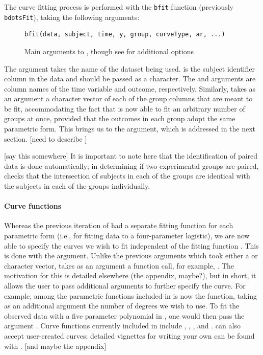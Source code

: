 The curve fitting process is performed with the \texttt{bfit} function (previously \texttt{bdotsFit}), taking the following arguments:


\begin{figure}[h!]
\centering
\begin{BVerbatim}
bfit(data, subject, time, y, group, curveType, ar, ...)
\end{BVerbatim}
\caption{Main arguments to , though see  for additional options}
\end{figure}



The  argument takes the name of the dataset being used.  is the subject identifier column in the data and should be passed as a character.  The  and  arguments are column names of the time variable and outcome, respectively. Similarly,  takes as an argument a character vector of each of the group columns that are meant to be fit, accommodating the fact that  is now able to fit an arbitrary number of groups at once, provided that the outcomes in each group adopt the same parametric form. This brings us to the  argument, which is addressed in the next section. [need to describe ]

[say this somewhere] It is important to note here that the identification of paired data is done automatically; in determining if two experimental groups are paired,  checks that the intersection of subjects in each of the groups are identical with the subjects in each of the groups individually.


\paragraph{Curve functions} Whereas the previous iteration of  had a separate fitting function for each parametric form (i.e.,  for fitting data to a four-parameter logistic), we are now able to specify the curves we wish to fit independent of the fitting function . This is done with the  argument. Unlike the previous arguments which took either a  or character  vector,  takes as an argument a function call, for example, . The motivation for this is detailed elsewhere (the appendix, maybe?), but in short, it allows the user to pass additional arguments to further specify the curve. For example, among the parametric functions included in  is now the  function, taking as an additional argument the number of degrees we wish to use. To fit the observed data with a five parameter polynomial in , one would then pass the argument . Curve functions currently included in  include , , , and .  can also accept user-created curves; detailed vignettes for writing your own can be found with . [and maybe the appendix]

